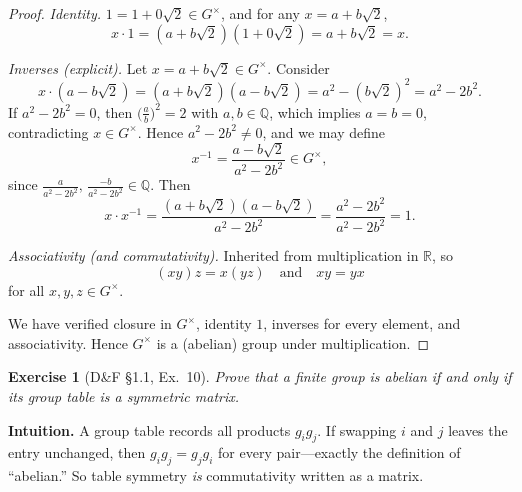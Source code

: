 \documentclass[12pt]{article}
\newtheorem{exercise}[theorem]{Exercise}
\theoremstyle{definition}
\begin{document}
\begin{proof}
\noindent
\emph{Identity.}
$1=1+0\sqrt2\in G^\times$, and for any $x=a+b\sqrt2$,
\[
x\cdot 1=(a+b\sqrt2)(1+0\sqrt2)=a+b\sqrt2=x.
\]

\noindent
\emph{Inverses (explicit).}
Let $x=a+b\sqrt2\in G^\times$. Consider
\[
x\cdot(a-b\sqrt2)=(a+b\sqrt2)(a-b\sqrt2)=a^2-(b\sqrt2)^2=a^2-2b^2.
\]
If $a^2-2b^2=0$, then $\bigl(\tfrac{a}{b}\bigr)^2=2$ with $a,b\in\mathbb{Q}$, which implies $a=b=0$,
contradicting $x\in G^\times$. Hence $a^2-2b^2\neq 0$, and we may define
\[
x^{-1}=\frac{a-b\sqrt2}{a^2-2b^2}\in G^\times,
\]
since $\frac{a}{a^2-2b^2},\,\frac{-b}{a^2-2b^2}\in\mathbb{Q}$. Then
\[
x\cdot x^{-1}
=\frac{(a+b\sqrt2)(a-b\sqrt2)}{a^2-2b^2}
=\frac{a^2-2b^2}{a^2-2b^2}
=1.
\]

\noindent
\emph{Associativity (and commutativity).}
Inherited from multiplication in $\mathbb{R}$, so
\[
(xy)z=x(yz)\quad\text{and}\quad xy=yx
\]
for all $x,y,z\in G^\times$.

\noindent
We have verified closure in $G^\times$, identity $1$, inverses for every element, and associativity.
Hence $G^\times$ is a (abelian) group under multiplication.
\end{proof}

\newpage

\begin{exercise}[D\&F §1.1, Ex.~10]
Prove that a finite group is abelian if and only if its group table is a symmetric matrix.
\end{exercise}

\dotfill

\noindent
\textbf{Intuition.}
A group table records all products $g_i g_j$. If swapping $i$ and $j$ leaves the entry unchanged,
then $g_i g_j=g_j g_i$ for every pair—exactly the definition of “abelian.” So table symmetry
\emph{is} commutativity written as a matrix.

\dotfill
\end{document}
